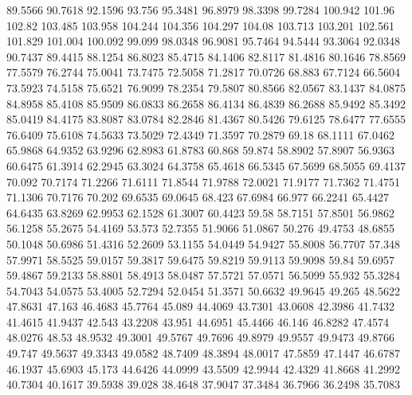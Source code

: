 89.5566      90.7618      92.1596      93.756      95.3481      96.8979      98.3398      99.7284      100.942      101.96      102.82      103.485      103.958      104.244      104.356      104.297      104.08      103.713      103.201      102.561      101.829      101.004      100.092      99.099      98.0348      96.9081      95.7464      94.5444      93.3064      92.0348      90.7437      89.4415      88.1254      86.8023      85.4715      84.1406      82.8117      81.4816      80.1646      78.8569      77.5579      76.2744      75.0041      73.7475      72.5058      71.2817      70.0726      68.883      67.7124      66.5604      
73.5923      74.5158      75.6521      76.9099      78.2354      79.5807      80.8566      82.0567      83.1437      84.0875      84.8958      85.4108      85.9509      86.0833      86.2658      86.4134      86.4839      86.2688      85.9492      85.3492      85.0419      84.4175      83.8087      83.0784      82.2846      81.4367      80.5426      79.6125      78.6477      77.6555      76.6409      75.6108      74.5633      73.5029      72.4349      71.3597      70.2879      69.18      68.1111      67.0462      65.9868      64.9352      63.9296      62.8983      61.8783      60.868      59.874      58.8902      57.8907      56.9363      
60.6475      61.3914      62.2945      63.3024      64.3758      65.4618      66.5345      67.5699      68.5055      69.4137      70.092      70.7174      71.2266      71.6111      71.8544      71.9788      72.0021      71.9177      71.7362      71.4751      71.1306      70.7176      70.202      69.6535      69.0645      68.423      67.6984      66.977      66.2241      65.4427      64.6435      63.8269      62.9953      62.1528      61.3007      60.4423      59.58      58.7151      57.8501      56.9862      56.1258      55.2675      54.4169      53.573      52.7355      51.9066      51.0867      50.276      49.4753      48.6855      
50.1048      50.6986      51.4316      52.2609      53.1155      54.0449      54.9427      55.8008      56.7707      57.348      57.9971      58.5525      59.0157      59.3817      59.6475      59.8219      59.9113      59.9098      59.84      59.6957      59.4867      59.2133      58.8801      58.4913      58.0487      57.5721      57.0571      56.5099      55.932      55.3284      54.7043      54.0575      53.4005      52.7294      52.0454      51.3571      50.6632      49.9645      49.265      48.5622      47.8631      47.163      46.4683      45.7764      45.089      44.4069      43.7301      43.0608      42.3986      41.7432      
41.4615      41.9437      42.543      43.2208      43.951      44.6951      45.4466      46.146      46.8282      47.4574      48.0276      48.53      48.9532      49.3001      49.5767      49.7696      49.8979      49.9557      49.9473      49.8766      49.747      49.5637      49.3343      49.0582      48.7409      48.3894      48.0017      47.5859      47.1447      46.6787      46.1937      45.6903      45.173      44.6426      44.0999      43.5509      42.9944      42.4329      41.8668      41.2992      40.7304      40.1617      39.5938      39.028      38.4648      37.9047      37.3484      36.7966      36.2498      35.7083      
